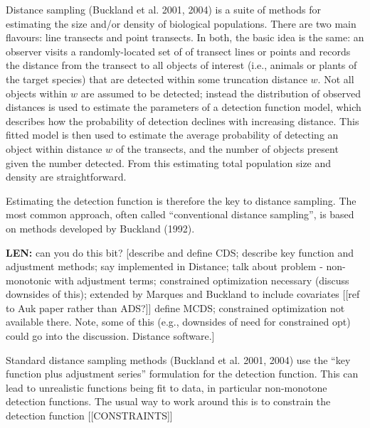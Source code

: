 \documentclass[useAMS,referee, usegraphicx]{biom}
\begin{document}
Distance sampling (Buckland et al. 2001, 2004) is a suite of methods for estimating the size and/or density of biological populations.  There are two main flavours: line transects and point transects.  In both, the basic idea is the same: an observer visits a randomly-located set of of transect lines or points and records the distance from the transect to all objects of interest (i.e., animals or plants of the target species) that are detected within some truncation distance $w$.  Not all objects within $w$ are assumed to be detected; instead the distribution of observed distances is used to estimate the parameters of a detection function model, which describes how the probability of detection declines with increasing distance.  This fitted model is then used to estimate the average probability of detecting an object within distance $w$ of the transects, and the number of objects present given the number detected. From this estimating total population size and density are straightforward.

Estimating the detection function is therefore the key to distance sampling.  The most common approach, often called ``conventional distance sampling'', is based on methods developed by Buckland (1992). 

\textbf{LEN:}  can you do this bit? [describe and define CDS; describe key function and adjustment methods; say implemented in Distance; talk about problem - non-monotonic with adjustment terms; constrained optimization necessary (discuss downsides of this); extended by Marques and Buckland to include covariates [[ref to Auk paper rather than ADS?]] define MCDS; constrained optimization not available there.  Note, some of this (e.g., downsides of need for constrained opt) could go into the discussion. Distance software.]

Standard distance sampling methods (Buckland et al. 2001, 2004) use the ``key function plus adjustment series'' formulation for the detection function. This can lead to unrealistic functions being fit to data, in particular non-monotone detection functions. The usual way to work around this is to constrain the detection function [[CONSTRAINTS]]
\end{document}
